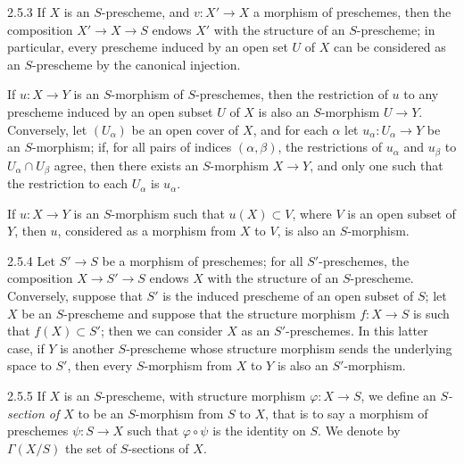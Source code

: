 \documentclass[../main.tex]{subfiles}
\begin{document}
\begin{env}{2.5.3}
    If $X$ is an $S$-prescheme, and $v\colon X'\to X$ a morphism of preschemes, then the composition $X'\to X\to S$ endows $X'$ with the structure of an $S$-prescheme; in particular, every prescheme induced by an open set $U$ of $X$ can be considered as an $S$-prescheme by the canonical injection.
\end{env}

If $u\colon X\to Y$ is an $S$-morphism of $S$-preschemes, then the restriction of $u$ to any prescheme induced by an open subset $U$ of $X$ is also an $S$-morphism $U\to Y$.
Conversely, let $(U_\alpha)$ be an open cover of $X$, and for each $\alpha$ let $u_\alpha\colon U_\alpha\to Y$ be an $S$-morphism; if, for all pairs of indices $(\alpha,\beta)$, the restrictions of $u_\alpha$ and $u_\beta$ to $U_\alpha\cap U_\beta$ agree, then there exists an $S$-morphism $X\to Y$, and only one such that the restriction to each $U_\alpha$ is $u_\alpha$.

If $u\colon X\to Y$ is an $S$-morphism such that $u(X)\subset V$, where $V$ is an open subset of $Y$, then $u$, considered as a morphism from $X$ to $V$, is also an $S$-morphism.

\begin{env}{2.5.4}
    Let $S'\to S$ be a morphism of preschemes; for all $S'$-preschemes, the composition $X\to S'\to S$ endows $X$ with the structure of an $S$-prescheme.
    Conversely, suppose that $S'$ is the induced prescheme of an open subset of $S$; let $X$ be an $S$-prescheme and suppose that the structure morphism $f\colon X\to S$ is such that $f(X)\subset S'$; then we can consider $X$ as an $S'$-preschemes.
    In this latter case, if $Y$ is another $S$-prescheme whose structure morphism sends the underlying space to $S'$, then every $S$-morphism from $X$ to $Y$ is also an $S'$-morphism.
\end{env}

\begin{env}{2.5.5}
    If $X$ is an $S$-prescheme, with structure morphism $\varphi\colon X\to S$, we define an \emph{$S$-section of $X$} to be an $S$-morphism from $S$ to $X$, that is to say a morphism of preschemes $\psi\colon S\to X$ such that $\varphi\circ\psi$ is the identity on $S$.
    We denote by $\Gamma(X/S)$ the set of $S$-sections of $X$.
\end{env}
\end{document}
